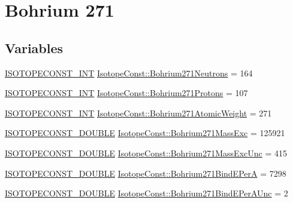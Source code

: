 \hypertarget{group___isotope_const-_bohrium-_bh271}{}\section{Bohrium 271}
\label{group___isotope_const-_bohrium-_bh271}
\subsection*{Variables}
\begin{DoxyCompactItemize}
\item 
\mbox{\hyperlink{group___isotope_const-_macros_ga5f18360b3e99483a35c32d789e62621c}{I\+S\+O\+T\+O\+P\+E\+C\+O\+N\+S\+T\+\_\+\+I\+NT}} \mbox{\hyperlink{group___isotope_const-_bohrium-_bh271_gac0ee85c39ede80a9c814e9f0d6d41b16}{Isotope\+Const\+::\+Bohrium271\+Neutrons}} = 164
\item 
\mbox{\hyperlink{group___isotope_const-_macros_ga5f18360b3e99483a35c32d789e62621c}{I\+S\+O\+T\+O\+P\+E\+C\+O\+N\+S\+T\+\_\+\+I\+NT}} \mbox{\hyperlink{group___isotope_const-_bohrium-_bh271_ga4f66bdd09ac167822e97742cc912a44e}{Isotope\+Const\+::\+Bohrium271\+Protons}} = 107
\item 
\mbox{\hyperlink{group___isotope_const-_macros_ga5f18360b3e99483a35c32d789e62621c}{I\+S\+O\+T\+O\+P\+E\+C\+O\+N\+S\+T\+\_\+\+I\+NT}} \mbox{\hyperlink{group___isotope_const-_bohrium-_bh271_ga75fbc5febe8660a6523a42cd37b62291}{Isotope\+Const\+::\+Bohrium271\+Atomic\+Weight}} = 271
\item 
\mbox{\hyperlink{group___isotope_const-_macros_ga8f45a7272ce02c0b4c65c44636ed719a}{I\+S\+O\+T\+O\+P\+E\+C\+O\+N\+S\+T\+\_\+\+D\+O\+U\+B\+LE}} \mbox{\hyperlink{group___isotope_const-_bohrium-_bh271_gada5f8e3f6544029d344bb2a282d8fd58}{Isotope\+Const\+::\+Bohrium271\+Mass\+Exc}} = 125921
\item 
\mbox{\hyperlink{group___isotope_const-_macros_ga8f45a7272ce02c0b4c65c44636ed719a}{I\+S\+O\+T\+O\+P\+E\+C\+O\+N\+S\+T\+\_\+\+D\+O\+U\+B\+LE}} \mbox{\hyperlink{group___isotope_const-_bohrium-_bh271_ga1ddae73fe76937f14475a4e1d076adf8}{Isotope\+Const\+::\+Bohrium271\+Mass\+Exc\+Unc}} = 415
\item 
\mbox{\hyperlink{group___isotope_const-_macros_ga8f45a7272ce02c0b4c65c44636ed719a}{I\+S\+O\+T\+O\+P\+E\+C\+O\+N\+S\+T\+\_\+\+D\+O\+U\+B\+LE}} \mbox{\hyperlink{group___isotope_const-_bohrium-_bh271_ga1944823ce2a854996e24932bbc909be7}{Isotope\+Const\+::\+Bohrium271\+Bind\+E\+PerA}} = 7298
\item 
\mbox{\hyperlink{group___isotope_const-_macros_ga8f45a7272ce02c0b4c65c44636ed719a}{I\+S\+O\+T\+O\+P\+E\+C\+O\+N\+S\+T\+\_\+\+D\+O\+U\+B\+LE}} \mbox{\hyperlink{group___isotope_const-_bohrium-_bh271_ga71d2f952fdb4755d562f443f5466fd7a}{Isotope\+Const\+::\+Bohrium271\+Bind\+E\+Per\+A\+Unc}} = 2

\end{DoxyCompactItemize}
